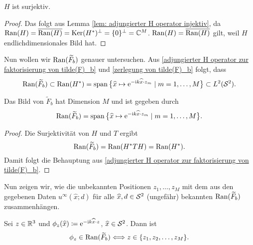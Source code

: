 \begin{lem}\label{lem: H surjektiv}
	\(H\) ist surjektiv.
\end{lem}
\begin{proof}
	Das folgt aus Lemma \ref{lem: adjungierter H operator injektiv}, da \(\operatorname{Ran}(H)=\overline{\operatorname{Ran}(H)}=\operatorname{Ker}(H^\ast)^\perp=\{0\}^\perp=\mathbb{C}^M\). \(\operatorname{Ran}(H)=\overline{\operatorname{Ran}(H)}\) gilt, weil \(H\) endlichdimensionales Bild hat.
\end{proof}
Nun wollen wir \(\operatorname{Ran}(\widetilde{F}_b)\) genauer untersuchen. Aus \eqref{adjungierter H operator zur faktorisierung von tilde(F)_b} und \eqref{zerlegung von tilde(F)_b} folgt, dass
\begin{equation*}
	\operatorname{Ran}(\widetilde{F}_b)\subset\operatorname{Ran}(H^\ast)=\operatorname{span}\big\{\widehat{x}\mapsto\mathrm{e}^{-\mathrm{i} k\widehat{x}\cdot z_m}\mid m=1,\ldots,M\big\}\subset L^2(\mathcal{S}^2).
\end{equation*}
\begin{satz}\label{satz: charakterisierung bild von F_b}
	Das Bild von \(\widetilde{F}_b\) hat Dimension \(M\) und ist gegeben durch
	\begin{equation*}
		\operatorname{Ran}(\widetilde{F}_b)=\operatorname{span}\big\{\widehat{x}\mapsto\mathrm{e}^{-\mathrm{i} k\widehat{x}\cdot z_m}\mid m=1,\ldots,M\big\}.
	\end{equation*}
\end{satz}
\begin{proof}
	Die Surjektivität von \(H\) und \(T\) ergibt 
	\begin{equation*}
		\operatorname{Ran}(\widetilde{F}_b)=\operatorname{Ran}(H^\ast TH)=\operatorname{Ran}(H^\ast).
	\end{equation*}
	Damit folgt die Behauptung aus \eqref{adjungierter H operator zur faktorisierung von tilde(F)_b}.
\end{proof}
Nun zeigen wir, wie die unbekannten Positionen \(z_1,\ldots,z_M\) mit dem aus den gegebenen Daten \(u^\infty(\widehat{x};d)\) für alle \(\widehat{x},d\in\mathcal{S}^2\) (ungefähr) bekannten \(\operatorname{Ran}(\widetilde{F}_b)\) zusammenhängen.
\begin{satz}\label{satz: charakterisierung bild F_b mit phi_z funktionen}
	Sei \(z\in\mathbb{R}^3\) und \(\phi_z(\widehat{x})\coloneqq\mathrm{e}^{-\mathrm{i} k\widehat{x}\cdot z}\), \(\widehat{x}\in\mathcal{S}^2\). Dann ist
	\begin{equation*}
		\phi_z\in\operatorname{Ran}(\widetilde{F}_b)\Longleftrightarrow z\in\{z_1,z_2,\ldots,z_M\}.
	\end{equation*}
\end{satz}
